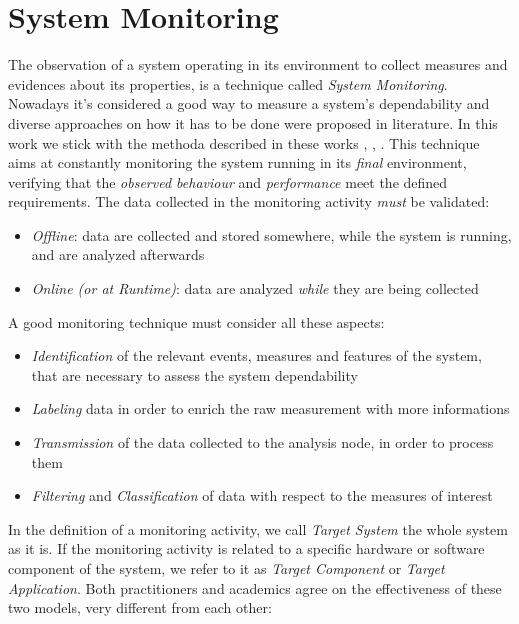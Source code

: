 \section{System Monitoring}

The observation of a system operating in its environment to collect measures and evidences about its properties, is a technique called \textsl{System Monitoring}. Nowadays it's considered a good way to measure a system's dependability and diverse approaches on how it has to be done were proposed in literature. In this work we stick with the methoda described in these works \cite{monitor1}, \cite{monitor2}, \cite{monitor3}.
This technique aims at constantly monitoring the system running in its \textsl{final} environment, verifying that the \textsl{observed behaviour} and \textsl{performance} meet the defined requirements.
The data collected in the monitoring activity \textsl{must} be validated:

\begin{itemize}
	\item \textsl{Offline}: data are collected and stored somewhere, while the system is running, and are analyzed afterwards
	\item \textsl{Online (or at Runtime)}: data are analyzed \textsl{while} they are being collected
\end{itemize}

A good monitoring technique must consider all these aspects:

\begin{itemize}
	\item \textsl{Identification} of the relevant events, measures and features of the system, that are necessary to assess the system dependability
	\item \textsl{Labeling} data in order to enrich the raw measurement with more informations
	\item \textsl{Transmission} of the data collected to the analysis node, in order to process them
	\item \textsl{Filtering} and \textsl{Classification} of data with respect to the measures of interest
\end{itemize}

In the definition of a monitoring activity, we call \textsl{Target System} the whole system as it is. If the monitoring activity is related to a specific hardware or software component of the system, we refer to it as \textsl{Target Component} or \textsl{Target Application}. Both practitioners and academics agree on the effectiveness of these two models, very different from each other:

